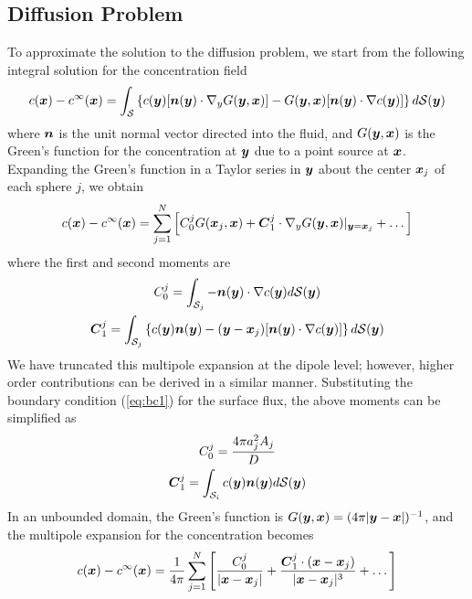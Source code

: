 \begin{appendices}
\subsection{Diffusion Problem}

To approximate the solution to the diffusion problem, we start from the following integral solution for the concentration field
\begin{equation}
    c(\boldsymbol{x}) - c^{\infty}(\boldsymbol{x}) = \int_{\mathcal{S}} \left\{ c(\boldsymbol{y})[\boldsymbol{n}(\boldsymbol{y})\cdot \nabla_y G(\boldsymbol{y},\boldsymbol{x})]  -  G(\boldsymbol{y},\boldsymbol{x}) [\boldsymbol{n}(\boldsymbol{y})\cdot \nabla c(\boldsymbol{y})] \right\} d \mathcal{S}(\boldsymbol{y})
\end{equation}
where $\boldsymbol{n}$ is the unit normal vector directed into the fluid, and $G(\boldsymbol{y},\boldsymbol{x})$ is the Green's function for the concentration at $\boldsymbol{y}$ due to a point source at $\boldsymbol{x}$.  Expanding the Green's function in a Taylor series in $\boldsymbol{y}$ about the center $\boldsymbol{x}_j$ of each sphere $j$, we obtain
\begin{equation}
    c(\boldsymbol{x}) - c^{\infty}(\boldsymbol{x})  = \sum^N_{j=1} \left[ C_0^j G(\boldsymbol{x}_j,\boldsymbol{x}) + \boldsymbol{C}_1^j\cdot \nabla_y G(\boldsymbol{y},\boldsymbol{x})\rvert_{\boldsymbol{y}=\boldsymbol{x}_j} + \dots \right] 
\end{equation}
where the first and second moments are 
\begin{gather}
    C_0^j = \int_{\mathcal{S}_j} - \boldsymbol{n}(\boldsymbol{y})\cdot \nabla c(\boldsymbol{y})d \mathcal{S}(\boldsymbol{y})
    \\
    \boldsymbol{C}_1^j = \int_{\mathcal{S}_j} \left\{ c(\boldsymbol{y})\boldsymbol{n}(\boldsymbol{y}) - (\boldsymbol{y}-\boldsymbol{x}_j)[\boldsymbol{n}(\boldsymbol{y})\cdot \nabla c(\boldsymbol{y})] \right\} d \mathcal{S}(\boldsymbol{y})
\end{gather}
We have truncated this multipole expansion at the dipole level; however, higher order contributions can be derived in a similar manner. Substituting the boundary condition (\ref{eq:bc1}) for the surface flux, the above moments can be simplified as
\begin{gather}
    C_0^j = \frac{4\pi a_j^2 A_j}{D}
    \\
    \boldsymbol{C}_1^j = \int_{\mathcal{S}_i} c(\boldsymbol{y})\boldsymbol{n}(\boldsymbol{y}) d \mathcal{S}(\boldsymbol{y})
\end{gather}
In an unbounded domain, the Green's function is $G(\boldsymbol{y},\boldsymbol{x}) = (4\pi \lvert \boldsymbol{y}-\boldsymbol{x}\rvert)^{-1}$, and the multipole expansion for the concentration becomes
\begin{equation}
    c(\boldsymbol{x}) - c^{\infty}(\boldsymbol{x})  = \frac{1}{4\pi} \sum^N_{j=1} \left[ \frac{C_0^j}{\lvert\boldsymbol{x}-\boldsymbol{x}_j\rvert}  + \frac{\boldsymbol{C}_1^j\cdot(\boldsymbol{x}-\boldsymbol{x}_j)}{\lvert\boldsymbol{x}-\boldsymbol{x}_j\rvert^3} + \dots \right] \label{eq:multipole}
\end{equation}


\end{appendices}
